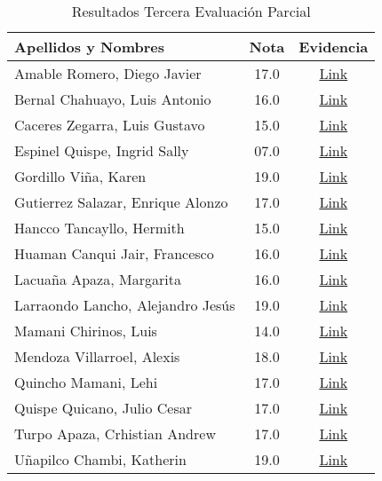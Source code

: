 \begin{table}[h]
\centering
\begin{tabular}{l|c|c}
\hline
\textbf{Apellidos y Nombres} & 
\textbf{Nota} & 
\textbf{Evidencia} 
\\ \hline
Amable Romero, Diego Javier &
17.0 &
\href{https://drive.google.com/open?id=1RGE-0KmemYyM1_d2kqPFSByuEEYTf70C}{Link}
\\ \hline
Bernal Chahuayo, Luis Antonio &
16.0 &
\href{https://drive.google.com/open?id=1FeRY8FPwENPs6JGo3LrUYZigr4FfQQH4}{Link}
\\ \hline
Caceres Zegarra, Luis Gustavo &
15.0 &
\href{https://drive.google.com/open?id=1aRhn2lBo3sZXlTMA4sh9wJ5r5g2bXE8T}{Link}
\\ \hline
Espinel Quispe, Ingrid Sally &
07.0 &
\href{https://drive.google.com/open?id=135na5wEvQ_LrngLGUhVwp92BpkZ2PblH}{Link}
\\ \hline
Gordillo Viña, Karen &
19.0 &
\href{https://drive.google.com/open?id=12-LqWuAXj5IB53-Me7gi4mJz6In7qewI}{Link}
\\ \hline
Gutierrez Salazar, Enrique Alonzo &
17.0 &
\href{https://drive.google.com/open?id=10fti0Nvn_GhppfJQ0cGxxPrEwGgbgulw}{Link}
\\ \hline
Hancco Tancayllo, Hermith &
15.0 &
\href{https://drive.google.com/open?id=15XyNJkvHo4XuC1ylerS8IQey5eImNxRR}{Link}
\\ \hline
Huaman Canqui Jair, Francesco &
16.0 &
\href{https://drive.google.com/open?id=1KHvPDBSUBZqywpxbN_niUf8PdkRjzBoC}{Link}
\\ \hline
Lacuaña Apaza, Margarita &
16.0 &
\href{https://drive.google.com/open?id=1OZAFwkOkPnFwLvVwAAH-jvAhziwBx09o}{Link}
\\ \hline
Larraondo Lancho, Alejandro Jesús &
19.0 &
\href{https://drive.google.com/open?id=1qjRtWRIrA7fcinCeWOX74rG9vonaawIF}{Link}
\\ \hline
Mamani Chirinos, Luis &
14.0 &
\href{https://drive.google.com/open?id=1JrGsIkJzS_lwTkOaSZdIipVaRmakLodP}{Link}
\\ \hline
Mendoza Villarroel, Alexis &
18.0 &
\href{https://drive.google.com/open?id=1xQ0p9bxbJRba3aqW5BiKMy3jFEyogEPM}{Link}
\\ \hline
Quincho Mamani, Lehi &
17.0 &
\href{https://drive.google.com/open?id=1X4sgTvGoHOD-xrGULO0eLx6MiX9UB26f}{Link}
\\ \hline
Quispe Quicano, Julio Cesar &
17.0 &
\href{https://drive.google.com/open?id=1498VuZAYY9B6AScuvHA5EMFrCAxscPer}{Link}
\\ \hline
Turpo Apaza, Crhistian Andrew &
17.0 &
\href{https://drive.google.com/open?id=14HnFWBEkh2y6LEVVtxKpaJqsddbscORE}{Link}
\\ \hline
Uñapilco Chambi, Katherin &
19.0 &
\href{https://drive.google.com/open?id=1fXM-Ufvhy0M0FVDEkZ8dclLG2OK0P8ga}{Link}
\\ \hline
\end{tabular}
\caption{Resultados Tercera Evaluación Parcial}
\label{tab:evalucion_parcial_3} %
\end{table}

